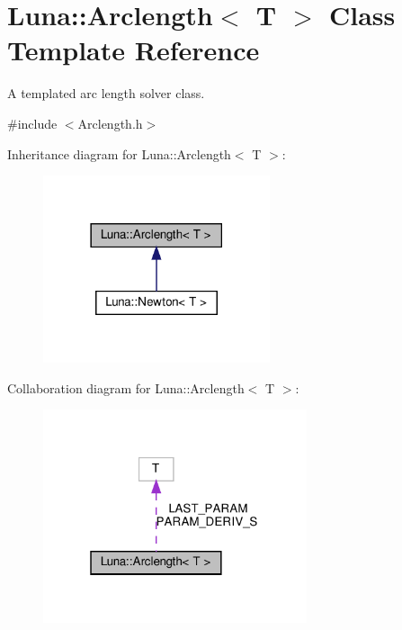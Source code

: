 \hypertarget{classLuna_1_1Arclength}{}\section{Luna\+:\+:Arclength$<$ T $>$ Class Template Reference}
\label{classLuna_1_1Arclength}


A templated arc length solver class.  




{\ttfamily \#include $<$Arclength.\+h$>$}



Inheritance diagram for Luna\+:\+:Arclength$<$ T $>$\+:\nopagebreak
\begin{figure}[H]
\begin{center}
\leavevmode
\includegraphics[width=189pt]{classLuna_1_1Arclength__inherit__graph}
\end{center}
\end{figure}


Collaboration diagram for Luna\+:\+:Arclength$<$ T $>$\+:\nopagebreak
\begin{figure}[H]
\begin{center}
\leavevmode
\includegraphics[width=220pt]{classLuna_1_1Arclength__coll__graph}
\end{center}
\end{figure}
